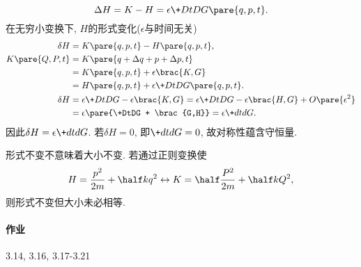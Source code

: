 \documentclass[../LectureNotes.tex]{subfiles}
\begin{document}
\[ \Delta H = K - H = \epsilon \+DtD{G\pare{q,p,t}}. \]
在无穷小变换下, $H$的形式变化($\epsilon$与时间无关)
\begin{align*}
    \delta H &= K\pare{q,p,t} - H\pare{q,p,t}, \\
    K\pare{Q,P,t} &= K\pare{q+\Delta q + p+\Delta p, t} \\ &= K\pare{q,p,t} + \epsilon\brac{K,G} \\
    &= H\pare{q,p,t} + \epsilon \+DtD{G\pare{q,p,t}}. \\
    \delta H &= \epsilon \+DtDG - \epsilon\brac{K,G} = \epsilon \+DtDG - \epsilon\brac{H,G} + O\pare{\epsilon^2} \\
    &= \epsilon\pare{\+DtDG + \brac{G,H}} = \epsilon \+dtdG.
\end{align*}
因此$\displaystyle \delta H = \epsilon \+dtdG$. 若$\delta H = 0$, 即$\displaystyle \+dtdG = 0$, 故对称性蕴含守恒量.
\begin{remark}
    形式不变不意味着大小不变. 若通过正则变换使
    \[ H = \frac{p^2}{2m} + \half kq^2 \leftrightarrow K = \half \frac{P^2}{2m} + \half kQ^2, \]
    则形式不变但大小未必相等.
\end{remark}

\paragraph{作业} %
\label{par:作业}

3.14, 3.16, 3.17-3.21

\end{document}
